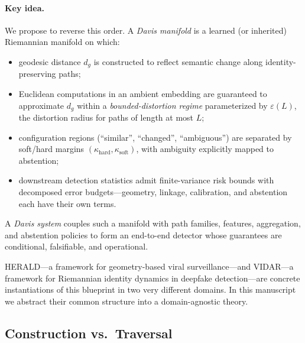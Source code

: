\documentclass[11pt]{article}
\theoremstyle{remark}
\theoremstyle{plain}
\begin{document}
\paragraph{Key idea.}
We propose to reverse this order. A \emph{Davis manifold} is a learned (or inherited) Riemannian manifold on which:
\begin{itemize}[leftmargin=*]
    \item geodesic distance $d_g$ is constructed to reflect semantic change along identity-preserving paths;
    \item Euclidean computations in an ambient embedding are guaranteed to approximate $d_g$ within a \emph{bounded-distortion regime} parameterized by $\varepsilon(L)$, the distortion radius for paths of length at most $L$;
    \item configuration regions (``similar'', ``changed'', ``ambiguous'') are separated by soft/hard margins $(\kappa_{\text{hard}}, \kappa_{\text{soft}})$, with ambiguity explicitly mapped to abstention;
    \item downstream detection statistics admit finite-variance risk bounds with decomposed error budgets---geometry, linkage, calibration, and abstention each have their own terms.
\end{itemize}
A \emph{Davis system} couples such a manifold with path families, features, aggregation, and abstention policies to form an end-to-end detector whose guarantees are conditional, falsifiable, and operational.

HERALD---a framework for geometry-based viral surveillance---and VIDAR---a framework for Riemannian identity dynamics in deepfake detection---are concrete instantiations of this blueprint in two very different domains.  In this manuscript we abstract their common structure into a domain-agnostic theory.

\subsection{Construction vs.\ Traversal}
\label{sec:construction-vs-traversal}
\end{document}
